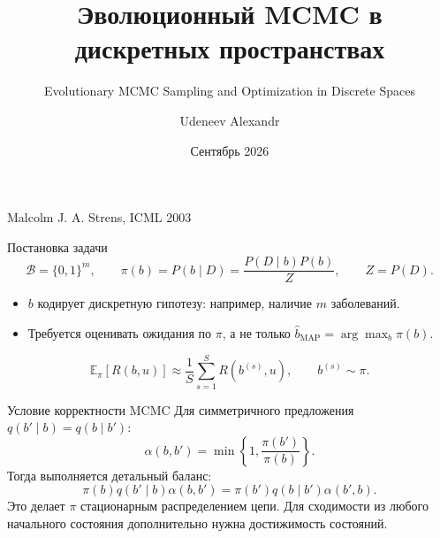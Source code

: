 \documentclass[aspectratio=169,11pt]{beamer}
\title{Эволюционный MCMC в дискретных пространствах}
\subtitle{Evolutionary MCMC Sampling and Optimization in Discrete Spaces}
\author{Udeneev Alexandr}
\date{Сентябрь 2026}
\begin{document}
\begin{frame}[plain]
  \vspace{1.3cm}
  {\inserttitle\par}
  \vspace{0.28cm}
  {\large\color{accent}\insertsubtitle\par}
  \vspace{0.22cm}
  {\large Malcolm J. A. Strens, ICML 2003\par}
  \vfill
  \insertauthor\hfill\insertdate
\end{frame}

\begin{frame}{Постановка задачи}
  \[
    \mathcal B=\{0,1\}^{m},\qquad
    \pi(b)=P(b\mid D)=\frac{P(D\mid b)P(b)}{Z},
    \qquad Z=P(D).
  \]
  \vspace{0.25cm}
  \begin{itemize}\setlength{\itemsep}{0.3cm}
    \item $b$ кодирует дискретную гипотезу: например, наличие $m$ заболеваний.
    \item Требуется оценивать ожидания по $\pi$, а не только
      $\hat b_{\mathrm{MAP}}=\arg\max_b\pi(b)$.
  \end{itemize}
  \[
    \mathbb E_{\pi}[R(b,u)]
    \approx \frac1S\sum_{s=1}^{S}R(b^{(s)},u),
    \qquad b^{(s)}\sim\pi.
  \]
\end{frame}

\begin{frame}{Условие корректности MCMC}
  Для симметричного предложения $q(b'\mid b)=q(b\mid b')$:
  \[
    \alpha(b,b')
    =\min\left\{1,\frac{\pi(b')}{\pi(b)}\right\}.
  \]
  Тогда выполняется детальный баланс:
  \[
    \pi(b)q(b'\mid b)\alpha(b,b')
    =\pi(b')q(b\mid b')\alpha(b',b).
  \]
  \vspace{0.2cm}
  Это делает $\pi$ стационарным распределением цепи. Для сходимости из
  любого начального состояния дополнительно нужна достижимость состояний.
\end{frame}
\end{document}

